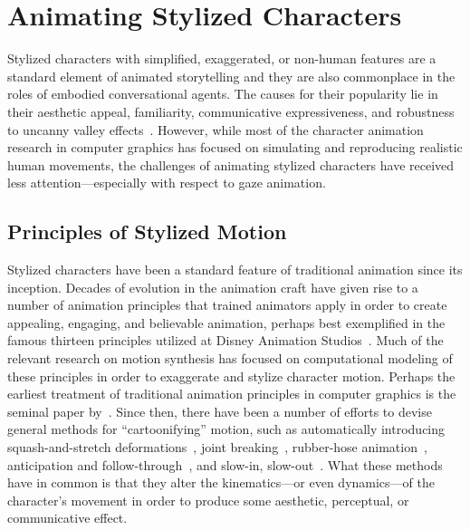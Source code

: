\section{Animating Stylized Characters}
\label{sec:AnimatingStylizedCharacters}

Stylized characters with simplified, exaggerated, or non-human features are a standard element of animated storytelling and they are also commonplace in the roles of embodied conversational agents. The causes for their popularity lie in their aesthetic appeal, familiarity, communicative expressiveness, and robustness to uncanny valley effects~\citep{mori2012uncanny}. However, while most of the character animation research in computer graphics has focused on simulating and reproducing realistic human movements, the challenges of animating stylized characters have received less attention---especially with respect to gaze animation.

\subsection{Principles of Stylized Motion}

Stylized characters have been a standard feature of traditional animation since its inception. Decades of evolution in the animation craft have given rise to a number of animation principles that trained animators apply in order to create appealing, engaging, and believable animation, perhaps best exemplified in the famous thirteen principles utilized at Disney Animation Studios~\citep{thomas1981illusion}. Much of the relevant research on motion synthesis has focused on computational modeling of these principles in order to exaggerate and stylize character motion. Perhaps the earliest treatment of traditional animation principles in computer graphics is the seminal paper by~\citet{lasseter1987principles}. Since then, there have been a number of efforts to devise general methods for ``cartoonifying'' motion, such as automatically introducing squash-and-stretch deformations~\citep{chenney2002simulating,wang2006filter,kwon2012squash}, joint breaking~\citep{noble2007deform}, rubber-hose animation~\citep{kwon2008exaggerating}, anticipation and follow-through~\citep{choi2004anticipation,wang2006filter,kim2006anticipation}, and slow-in, slow-out~\citep{kwon2011slowin}. What these methods have in common is that they alter the kinematics---or even dynamics---of the character's movement in order to produce some aesthetic, perceptual, or communicative effect.


